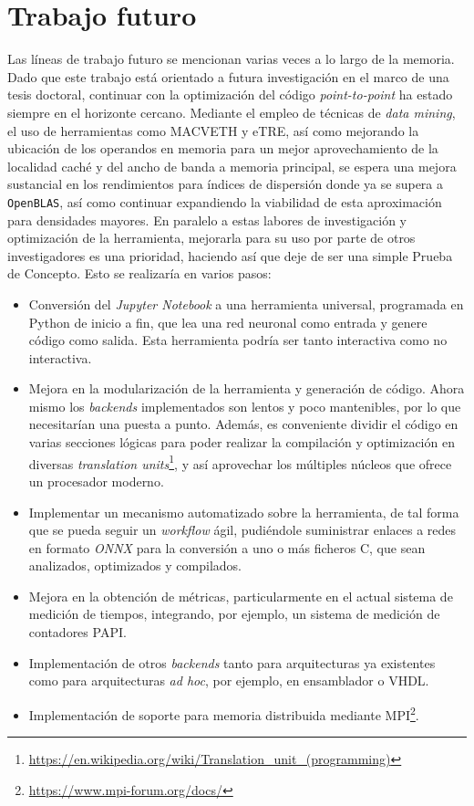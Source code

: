 \section{Trabajo futuro}
Las líneas de trabajo futuro se mencionan varias veces a lo largo de la memoria. Dado que este trabajo está orientado a futura investigación en el marco de una tesis doctoral, continuar con la optimización del código \textit{point-to-point} ha estado siempre en el horizonte cercano. Mediante el empleo de técnicas de \textit{data mining}, el uso de herramientas como MACVETH y eTRE, así como mejorando la ubicación de los operandos en memoria para un mejor aprovechamiento de la localidad caché y del ancho de banda a memoria principal, se espera una mejora sustancial en los rendimientos para índices de dispersión donde ya se supera a \texttt{OpenBLAS}, así como continuar expandiendo la viabilidad de esta aproximación para densidades mayores. En paralelo a estas labores de investigación y optimización de la herramienta, mejorarla para su uso por parte de otros investigadores es una prioridad, haciendo así que deje de ser una simple Prueba de Concepto. Esto se realizaría en varios pasos: 
\begin{itemize}
    \item Conversión del \textit{Jupyter Notebook} a una herramienta universal, programada en Python de inicio a fin, que lea una red neuronal como entrada y genere código como salida. Esta herramienta podría ser tanto interactiva como no interactiva.
    \item Mejora en la modularización de la herramienta y generación de código. Ahora mismo los \textit{backends} implementados son lentos y poco mantenibles, por lo que necesitarían una puesta a punto. Además, es conveniente dividir el código en varias secciones lógicas para poder realizar la compilación y optimización en diversas \textit{translation units}\footnote{\url{https://en.wikipedia.org/wiki/Translation_unit_(programming)}}, y así aprovechar los múltiples núcleos que ofrece un procesador moderno.
    \item Implementar un mecanismo automatizado sobre la herramienta, de tal forma que se pueda seguir un \textit{workflow} ágil, pudiéndole suministrar enlaces a redes en formato \textit{ONNX} para la conversión a uno o más ficheros C, que sean analizados, optimizados y compilados.
    \item Mejora en la obtención de métricas, particularmente en el actual sistema de medición de tiempos, integrando, por ejemplo, un sistema de medición de contadores PAPI.
    \item Implementación de otros \textit{backends} tanto para arquitecturas ya existentes como para arquitecturas \textit{ad hoc}, por ejemplo, en ensamblador o VHDL.
    \item Implementación de soporte para memoria distribuida mediante MPI\footnote{\url{https://www.mpi-forum.org/docs/}}.
\end{itemize}
